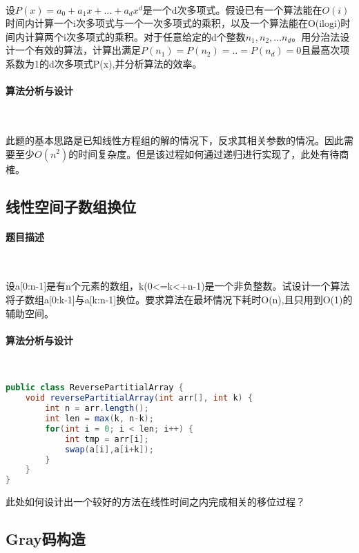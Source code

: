 \documentclass[UTF8]{ctexart}
\begin{document}
    ~

    设$P(x) = a_0 + a_1x + ... + a_dx^d$是一个d次多项式。假设已有一个算法能在$O(i)$时间内计算一个i次多项式与一个一次多项式的乘积，以及一个算法能在O(ilogi)时间内计算两个i次多项式的乘积。对于任意给定的d个整数$n_1,n_2,...n_d$。用分治法设计一个有效的算法，计算出满足$P(n_1) = P(n_2) = .. = P(n_d) = 0$且最高次项系数为1的d次多项式P(x),并分析算法的效率。

    \paragraph{算法分析与设计}

    ~

    此题的基本思路是已知线性方程组的解的情况下，反求其相关参数的情况。因此需要至少$O(n^2)$的时间复杂度。但是该过程如何通过递归进行实现了，此处有待商榷。

    \subsection{线性空间子数组换位}
    \paragraph{题目描述}

    ~

    设a[0:n-1]是有n个元素的数组，k(0<=k<+n-1)是一个非负整数。试设计一个算法将子数组a[0:k-1]与a[k:n-1]换位。要求算法在最坏情况下耗时O(n),且只用到O(1)的辅助空间。

    \paragraph{算法分析与设计}

    ~

\begin{small}
\begin{lstlisting}[language=java]
public class ReversePartitialArray {
    void reversePartitialArray(int arr[], int k) {
        int n = arr.length();
        int len = max(k, n-k);
        for(int i = 0; i < len; i++) {
            int tmp = arr[i];
            swap(a[i],a[i+k]);
        }
    }
}
\end{lstlisting}
\end{small}

    此处如何设计出一个较好的方法在线性时间之内完成相关的移位过程？

    \subsection{Gray码构造}
\end{document}
